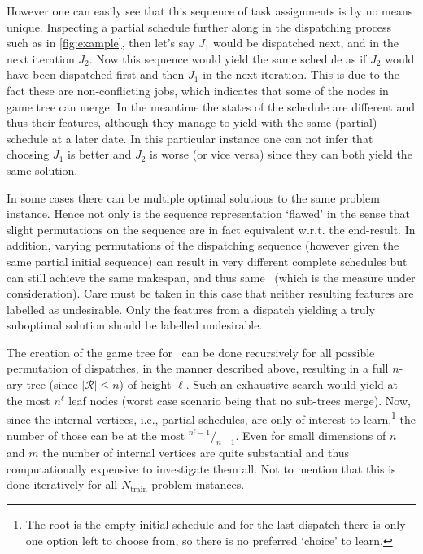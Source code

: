 However one can easily see that this sequence of task assignments is by no means unique. 
Inspecting a partial schedule further along in the dispatching process such as in \cref{fig:example}, then let's say $J_1$ would be dispatched next, and in the next iteration $J_2$. 
Now this sequence would yield the same schedule as if $J_2$ would have been dispatched first and then $J_1$ in the next iteration. 
This is due to the fact these are non-conflicting jobs, which indicates that some of the nodes in game tree can merge. 
In the meantime the states of the schedule are different and thus their features, although they manage to yield with the same (partial) schedule at a later date.  %
In this particular instance one can not infer that choosing $J_1$ is better and $J_2$ is worse (or vice versa) since they can both yield the same solution.

In some cases there can be multiple optimal solutions to the same problem instance. 
Hence not only is the sequence representation `flawed' in the sense that slight permutations on the sequence are in fact equivalent w.r.t. the end-result.
In addition, varying permutations of the dispatching sequence (however given the same partial initial sequence) can result in very different complete schedules but can still achieve the same makespan, and thus same \fullnamerho\ (which is the measure under consideration). 
Care must be taken in this case that neither resulting features are labelled as undesirable. 
Only the features from a dispatch yielding a truly suboptimal solution should be labelled undesirable. 

The creation of the game tree for \jsp\ can be done recursively for all possible permutation of dispatches, in the manner described above, resulting in a full \mbox{$n$-ary} tree (since $|\mathcal{R}|\leq n$) of height $\ell$. Such an exhaustive search would yield at the most $n^{\ell}$ leaf nodes (worst case scenario being that no sub-trees merge). Now, since the internal vertices, i.e., partial schedules, are only of interest to learn,\footnote{The root is the empty initial schedule and for the last dispatch there is only one option left to choose from, so there is no preferred `choice' to learn.} the number of those can be at the most \mbox{${}^{n^{\ell}-1}/_{n-1}$}.
Even for small dimensions of $n$ and $m$ the number of internal vertices are quite substantial and thus computationally expensive to investigate them all. Not to mention that this is done iteratively for all $N_{\text{train}}$ problem instances.

